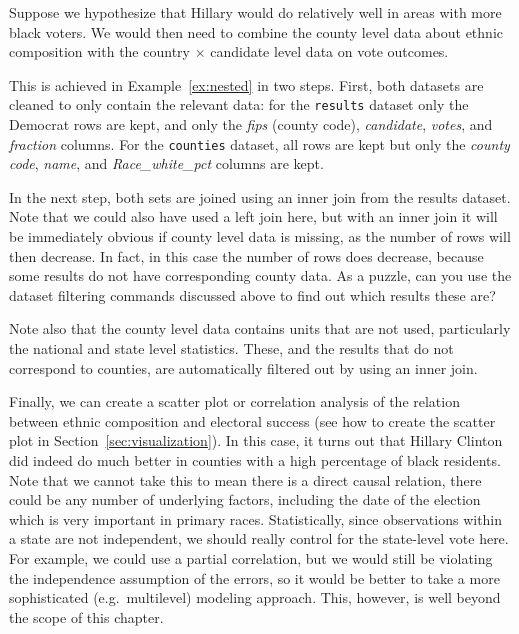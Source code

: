 
Suppose we hypothesize that Hillary would do relatively well in areas with more black voters.
We would then need to combine the county level data about ethnic composition with the country $\times$ candidate
level data on vote outcomes.

This is achieved in Example~\ref{ex:nested} in two steps.
First, both datasets are cleaned to only contain the relevant data:
for the \texttt{results} dataset only the Democrat rows are kept, and only the \emph{fips} (county code), \emph{candidate}, \emph{votes}, and \emph{fraction} columns.
For the \texttt{counties} dataset, all rows are kept but only the \emph{county code}, \emph{name}, and \emph{Race\_white\_pct} columns are kept.


In the next step, both sets are joined using an inner join from the results dataset.
Note that we could also have used a left join here, but with an inner join it will be immediately
obvious if county level data is missing, as the number of rows will then decrease.
In fact, in this case the number of rows does decrease, because some results do not have corresponding county data.
As a puzzle, can you use the dataset filtering commands discussed above to find out which results these are?

Note also that the county level data contains units that are not used, particularly the national and state level statistics.
These, and the results that do not correspond to counties, are automatically filtered out by using an inner join.

Finally, we can create a scatter plot or correlation analysis of the relation between ethnic composition and electoral success (see how to create the scatter plot in Section~\ref{sec:visualization}).
In this case, it turns out that Hillary Clinton did indeed do much better in counties with a high percentage of black residents.
Note that we cannot take this to mean there is a direct causal relation, there could be any number of underlying factors, including the date of the election which is very important in primary races.
Statistically, since observations within a state are not independent, we should really control for the state-level vote here.
For example, we could use a partial correlation, but we would still be violating the independence assumption of the errors,
so it would be better to take a more sophisticated (e.g.\ multilevel) modeling approach.
This, however, is well beyond the scope of this chapter.


